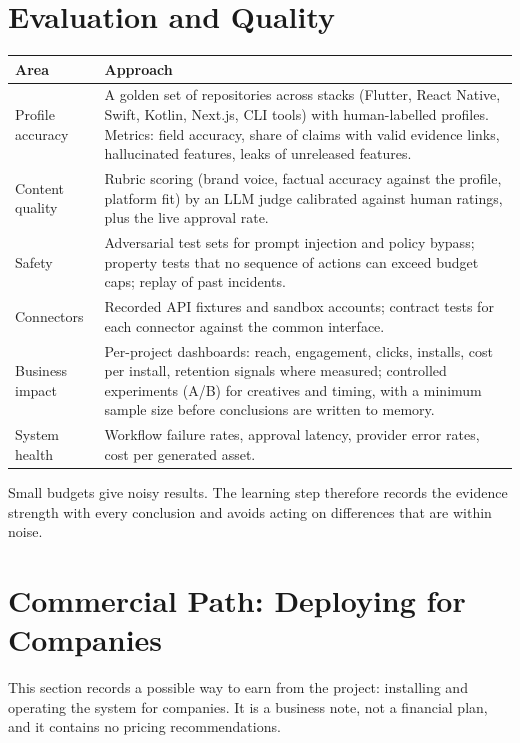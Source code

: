 \documentclass[11pt,a4paper]{article}
\begin{document}
\section{Evaluation and Quality}

\begin{longtable}{@{}p{3.6cm}p{11.7cm}@{}}
\toprule
\textbf{Area} & \textbf{Approach}\\
\midrule
\endhead
Profile accuracy & A golden set of repositories across stacks (Flutter, React Native, Swift, Kotlin, Next.js, CLI tools) with human-labelled profiles. Metrics: field accuracy, share of claims with valid evidence links, hallucinated features, leaks of unreleased features.\\
Content quality & Rubric scoring (brand voice, factual accuracy against the profile, platform fit) by an LLM judge calibrated against human ratings, plus the live approval rate.\\
Safety & Adversarial test sets for prompt injection and policy bypass; property tests that no sequence of actions can exceed budget caps; replay of past incidents.\\
Connectors & Recorded API fixtures and sandbox accounts; contract tests for each connector against the common interface.\\
Business impact & Per-project dashboards: reach, engagement, clicks, installs, cost per install, retention signals where measured; controlled experiments (A/B) for creatives and timing, with a minimum sample size before conclusions are written to memory.\\
System health & Workflow failure rates, approval latency, provider error rates, cost per generated asset.\\
\bottomrule
\end{longtable}

Small budgets give noisy results. The learning step therefore records the evidence strength with every conclusion and avoids acting on differences that are within noise.

\section{Commercial Path: Deploying for Companies}\label{sec:commercial}

This section records a possible way to earn from the project: installing and operating the system for companies. It is a business note, not a financial plan, and it contains no pricing recommendations.
\end{document}
